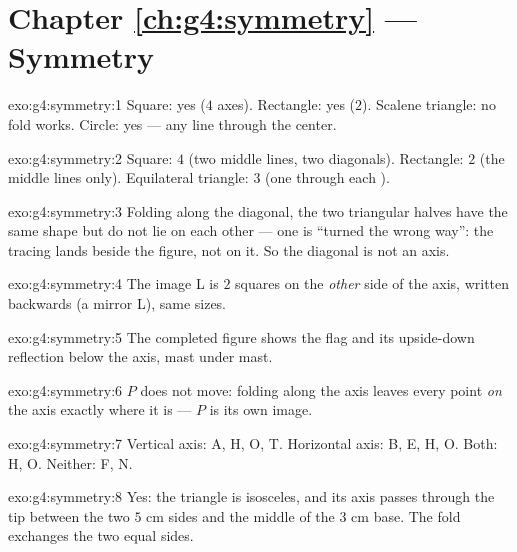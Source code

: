 \section*{Chapter \ref{ch:g4:symmetry} --- Symmetry}

\begin{solution}{exo:g4:symmetry:1}
Square: yes ($4$ axes). Rectangle: yes ($2$). Scalene triangle: no
fold works. Circle: yes --- any line through the center.
\end{solution}

\begin{solution}{exo:g4:symmetry:2}
Square: $4$ (two middle lines, two diagonals). Rectangle: $2$ (the
middle lines only). Equilateral triangle: $3$ (one through each
).
\end{solution}

\begin{solution}{exo:g4:symmetry:3}
Folding along the diagonal, the two triangular halves have the same
shape but do not lie on each other --- one is ``turned the wrong
way'': the tracing lands beside the figure, not on it. So the
diagonal is not an axis.
\end{solution}

\begin{solution}{exo:g4:symmetry:4}
The image L is $2$ squares on the \emph{other} side of the axis,
written backwards (a mirror L), same sizes.
\end{solution}

\begin{solution}{exo:g4:symmetry:5}
The completed figure shows the flag and its upside-down reflection
below the axis, mast under mast.
\end{solution}

\begin{solution}{exo:g4:symmetry:6}
$P$ does not move: folding along the axis leaves every point
\emph{on} the axis exactly where it is --- $P$ is its own image.
\end{solution}

\begin{solution}{exo:g4:symmetry:7}
Vertical axis: A, H, O, T. Horizontal axis: B, E, H, O. Both: H, O.
Neither: F, N.
\end{solution}

\begin{solution}{exo:g4:symmetry:8}
Yes: the triangle is isosceles, and its axis passes through the tip
between the two $5$ cm sides and the middle of the $3$ cm base. The
fold exchanges the two equal sides.
\end{solution}

